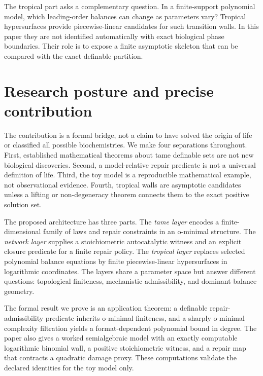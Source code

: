 \documentclass[11pt,a4paper]{article}
\theoremstyle{definition}
\theoremstyle{remark}
\begin{document}
The tropical part asks a complementary question. In a finite-support polynomial model, which leading-order balances can change as parameters vary? Tropical hypersurfaces provide piecewise-linear candidates for such transition walls. In this paper they are not identified automatically with exact biological phase boundaries. Their role is to expose a finite asymptotic skeleton that can be compared with the exact definable partition.

\section{Research posture and precise contribution}
The contribution is a formal bridge, not a claim to have solved the origin of life or classified all possible biochemistries. We make four separations throughout. First, established mathematical theorems about tame definable sets are not new biological discoveries. Second, a model-relative repair predicate is not a universal definition of life. Third, the toy model is a reproducible mathematical example, not observational evidence. Fourth, tropical walls are asymptotic candidates unless a lifting or non-degeneracy theorem connects them to the exact positive solution set.

The proposed architecture has three parts. The \emph{tame layer} encodes a finite-dimensional family of laws and repair constraints in an o-minimal structure. The \emph{network layer} supplies a stoichiometric autocatalytic witness and an explicit closure predicate for a finite repair policy. The \emph{tropical layer} replaces selected polynomial balance equations by finite piecewise-linear hypersurfaces in logarithmic coordinates. The layers share a parameter space but answer different questions: topological finiteness, mechanistic admissibility, and dominant-balance geometry.

The formal result we prove is an application theorem: a definable repair-admissibility predicate inherits o-minimal finiteness, and a sharply o-minimal complexity filtration yields a format-dependent polynomial bound in degree. The paper also gives a worked semialgebraic model with an exactly computable logarithmic binomial wall, a positive stoichiometric witness, and a repair map that contracts a quadratic damage proxy. These computations validate the declared identities for the toy model only.
\end{document}
